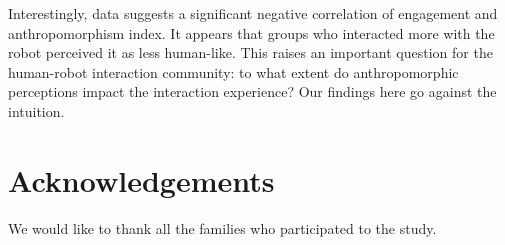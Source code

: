\documentclass{sig-alternate}
\begin{document}
Interestingly, data suggests a significant negative correlation of engagement
and anthropomorphism index. It appears that groups who interacted more with the
robot perceived it as less human-like. This raises an important question for the
human-robot interaction community: to what extent do anthropomorphic perceptions
impact the interaction experience? Our findings here go against the intuition.


\section*{Acknowledgements}
%
We would like to thank all the families who participated to the study.




\balancecolumns
\end{document}
